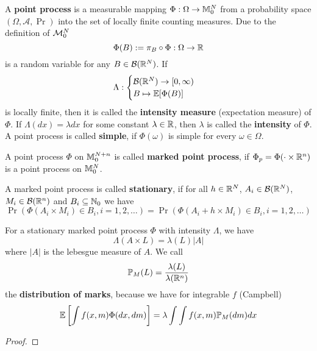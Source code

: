 \begin{definition}
	A \textbf{point process} is a measurable mapping \(\Phi:\Omega\to\locFiniteMeasure\)
	from a probability space \((\Omega, \mathcal{A}, \Pr)\) into the set of
	locally finite counting measures. Due to the definition of \(\locFiniteMeasAlg\)
	\[
		\Phi(B) := \pi_B\circ \Phi : \Omega \to \real
	\]
	is a random variable for any \(B\in\borel(\real^\dimension)\). If
	\[
		\Lambda:\begin{cases}
			\borel(\real^\dimension)\to [0,\infty)\\
			B \mapsto \E[\Phi(B)]
		\end{cases}
	\]
	is locally finite, then it is called the \textbf{intensity measure}
	(expectation measure) of \(\Phi\).  If \(\Lambda(dx) = \lambda dx\) for some
	constant \(\lambda\in\real\), then \(\lambda\) is called the
	\textbf{intensity} of \(\Phi\).
	A point process is called \textbf{simple}, if \(\Phi(\omega)\) is simple
	for every \(\omega\in\Omega\).
\end{definition}

\begin{definition}
	A point process \(\Phi\) on \(\locFiniteMeasure[\dimension+n]\) is called
	\textbf{marked point process}, if \(\Phi_p = \Phi(\cdot \times \real^n)\)
	is a point process on \(\locFiniteMeasure\).

	A marked point process is called \textbf{stationary}, if for all
	\(h\in\real^\dimension\), \(A_i\in\borel(\real^\dimension)\),
	\(M_i\in\borel(\real^n)\) and \(B_i\subseteq\nat_0\) we have
	\[
		\Pr(\Phi(A_i\times M_i) \in B_i, i=1,2,\dots)
		= \Pr(\Phi(A_i+h \times M_i)\in B_i, i=1,2,\dots)
	\]
\end{definition}

\begin{lemma}[Campbell]\label{lem: Campbell}
	For a stationary marked point process \(\Phi\) with intensity \(\Lambda\),
	we have	
	\[
		\Lambda(A \times L) = \lambda(L) |A|
	\]
	where \(|A|\) is the lebesgue measure of \(A\). We call
	\[
		\Pr_M(L) = \frac{\lambda(L)}{\lambda(\real^n)}
	\]
	the \textbf{distribution of marks}, because we have for integrable \(f\)
	(Campbell)
	\[
		\E\left[\int f(x,m) \Phi(dx,dm)\right]
		= \lambda \int \int f(x,m) \Pr_M(dm) dx
	\]
\end{lemma}
\begin{proof}
\end{proof}

